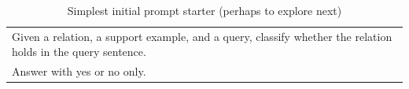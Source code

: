 \documentclass[12pt]{article}
\begin{document}
\begin{table}[h]
\centering
\begin{tabular}{l}
\toprule
Given a relation, a support example, and a query, classify whether the relation holds in the query sentence. \\
Answer with yes or no only. \\
\bottomrule
\end{tabular}
\caption{Simplest initial prompt starter (perhaps to explore next)}
\label{tab:starting-prompts}
\end{table}




%   
%     
\end{document}
